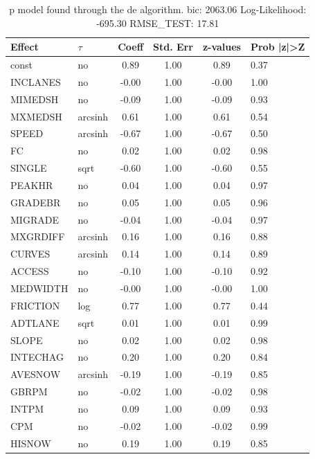 \begin{table}
	\caption{p model found through the de algorithm. bic: 2063.06 Log-Likelihood: -695.30 RMSE_TEST: 17.81}
	\begin{center}
		\begin{tabular}{|l|l|c|c|c|l|}
			\hline
			Effect & $\tau$ & Coeff & Std. Err & z-values & Prob |z|>Z \\
			\hline
			const & no & 0.89 & 1.00 & 0.89 & 0.37 \\
			\hline
			INCLANES & no & -0.00 & 1.00 & -0.00 & 1.00 \\
			\hline
			MIMEDSH & no & -0.09 & 1.00 & -0.09 & 0.93 \\
			\hline
			MXMEDSH & arcsinh & 0.61 & 1.00 & 0.61 & 0.54 \\
			\hline
			SPEED & arcsinh & -0.67 & 1.00 & -0.67 & 0.50 \\
			\hline
			FC & no & 0.02 & 1.00 & 0.02 & 0.98 \\
			\hline
			SINGLE & sqrt & -0.60 & 1.00 & -0.60 & 0.55 \\
			\hline
			PEAKHR & no & 0.04 & 1.00 & 0.04 & 0.97 \\
			\hline
			GRADEBR & no & 0.05 & 1.00 & 0.05 & 0.96 \\
			\hline
			MIGRADE & no & -0.04 & 1.00 & -0.04 & 0.97 \\
			\hline
			MXGRDIFF & arcsinh & 0.16 & 1.00 & 0.16 & 0.88 \\
			\hline
			CURVES & arcsinh & 0.14 & 1.00 & 0.14 & 0.89 \\
			\hline
			ACCESS & no & -0.10 & 1.00 & -0.10 & 0.92 \\
			\hline
			MEDWIDTH & no & -0.00 & 1.00 & -0.00 & 1.00 \\
			\hline
			FRICTION & log & 0.77 & 1.00 & 0.77 & 0.44 \\
			\hline
			ADTLANE & sqrt & 0.01 & 1.00 & 0.01 & 0.99 \\
			\hline
			SLOPE & no & 0.02 & 1.00 & 0.02 & 0.98 \\
			\hline
			INTECHAG & no & 0.20 & 1.00 & 0.20 & 0.84 \\
			\hline
			AVESNOW & arcsinh & -0.19 & 1.00 & -0.19 & 0.85 \\
			\hline
			GBRPM & no & -0.02 & 1.00 & -0.02 & 0.98 \\
			\hline
			INTPM & no & 0.09 & 1.00 & 0.09 & 0.93 \\
			\hline
			CPM & no & -0.02 & 1.00 & -0.02 & 0.99 \\
			\hline
			HISNOW & no & 0.19 & 1.00 & 0.19 & 0.85 \\

\end{tabular}
\end{center}
\end{table}
